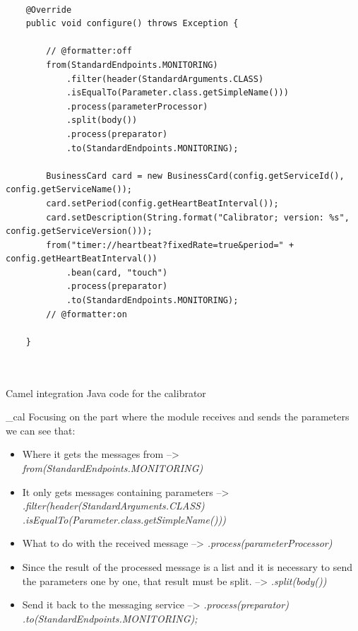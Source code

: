 \begin{table}[h]
\lstset{language=Java}
\begin{lstlisting}

    @Override
    public void configure() throws Exception {

        // @formatter:off
        from(StandardEndpoints.MONITORING)
            .filter(header(StandardArguments.CLASS)
            .isEqualTo(Parameter.class.getSimpleName()))
            .process(parameterProcessor)
            .split(body())
            .process(preparator)
            .to(StandardEndpoints.MONITORING);
        
        BusinessCard card = new BusinessCard(config.getServiceId(), config.getServiceName());
        card.setPeriod(config.getHeartBeatInterval());
        card.setDescription(String.format("Calibrator; version: %s", config.getServiceVersion()));
        from("timer://heartbeat?fixedRate=true&period=" + config.getHeartBeatInterval())
            .bean(card, "touch")
            .process(preparator)
            .to(StandardEndpoints.MONITORING);
        // @formatter:on

    }



\end{lstlisting}
\caption{Camel integration Java code for the calibrator}
\label{Table5.1}
\end{table}
\_cal
\pagebreak
Focusing on the part where the module receives and sends the parameters we can see that:

\begin{itemize}
\item Where it gets the messages from --> \emph{from(StandardEndpoints.MONITORING)}
\item It only gets messages containing parameters -->  \emph{.filter(header(StandardArguments.CLASS)}
            \emph{.isEqualTo(Parameter.class.getSimpleName()))}
\item What to do with the received message --> \emph{.process(parameterProcessor)}
\item Since the result of the processed message is a list and it is necessary to send the parameters one by one, that result must be split. --> \emph{.split(body())}
\item Send it back to the messaging service --> \emph{.process(preparator)}\linebreak
            \emph{.to(StandardEndpoints.MONITORING);}

\end{itemize}


